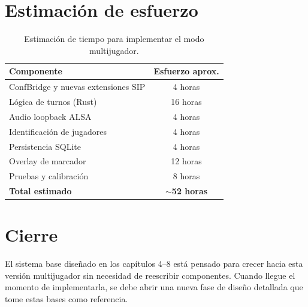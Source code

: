 \section{Estimación de esfuerzo}

\begin{table}[h]
\centering
\begin{tabular}{lc}
\toprule
\textbf{Componente} & \textbf{Esfuerzo aprox.} \\
\midrule
ConfBridge y nuevas extensiones SIP & 4 horas \\
Lógica de turnos (Rust) & 16 horas \\
Audio loopback ALSA & 4 horas \\
Identificación de jugadores & 4 horas \\
Persistencia SQLite & 4 horas \\
Overlay de marcador & 12 horas \\
Pruebas y calibración & 8 horas \\
\midrule
\textbf{Total estimado} & \textbf{$\sim$52 horas} \\
\bottomrule
\end{tabular}
\caption{Estimación de tiempo para implementar el modo multijugador.}
\end{table}

\section{Cierre}

El sistema base diseñado en los capítulos 4--8 está pensado para crecer hacia esta versión multijugador sin necesidad de reescribir componentes. Cuando llegue el momento de implementarla, se debe abrir una nueva fase de diseño detallada que tome estas bases como referencia.
